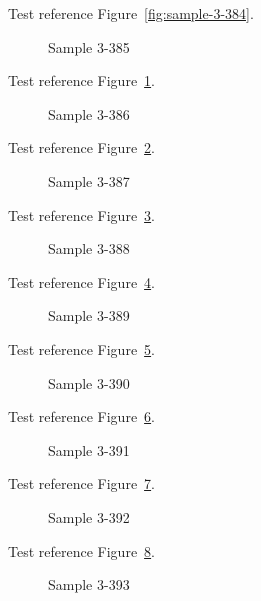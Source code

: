 Test reference Figure~\ref{fig:sample-3-384}.

\begin{figure}[tbhp]
\caption{Sample 3-385}
\label{fig:sample-3-385}
\end{figure}

Test reference Figure~\ref{fig:sample-3-385}.

\begin{figure}[tbhp]
\caption{Sample 3-386}
\label{fig:sample-3-386}
\end{figure}

Test reference Figure~\ref{fig:sample-3-386}.

\begin{figure}[tbhp]
\caption{Sample 3-387}
\label{fig:sample-3-387}
\end{figure}

Test reference Figure~\ref{fig:sample-3-387}.

\begin{figure}[tbhp]
\caption{Sample 3-388}
\label{fig:sample-3-388}
\end{figure}

Test reference Figure~\ref{fig:sample-3-388}.

\begin{figure}[tbhp]
\caption{Sample 3-389}
\label{fig:sample-3-389}
\end{figure}

Test reference Figure~\ref{fig:sample-3-389}.

\begin{figure}[tbhp]
\caption{Sample 3-390}
\label{fig:sample-3-390}
\end{figure}

Test reference Figure~\ref{fig:sample-3-390}.

\begin{figure}[tbhp]
\caption{Sample 3-391}
\label{fig:sample-3-391}
\end{figure}

Test reference Figure~\ref{fig:sample-3-391}.

\begin{figure}[tbhp]
\caption{Sample 3-392}
\label{fig:sample-3-392}
\end{figure}

Test reference Figure~\ref{fig:sample-3-392}.

\begin{figure}[tbhp]
\caption{Sample 3-393}
\label{fig:sample-3-393}
\end{figure}

